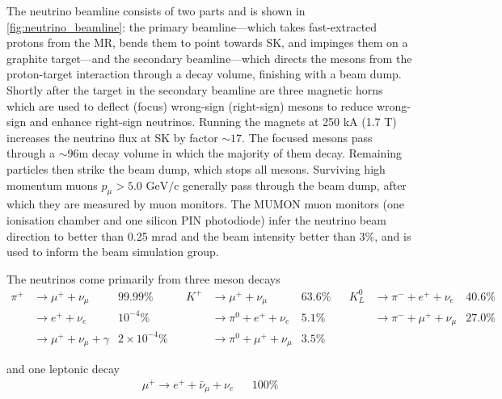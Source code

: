 The neutrino beamline consists of two parts and is shown in \autoref{fig:neutrino_beamline}: the primary beamline---which takes fast-extracted protons from the MR, bends them to point towards SK, and impinges them on a graphite target---and the secondary beamline---which directs the mesons from the proton-target interaction through a decay volume, finishing with a beam dump. Shortly after the target in the secondary beamline are three magnetic horns\cite{t2k_horns} which are used to deflect (focus) wrong-sign (right-sign) mesons to reduce wrong-sign and enhance right-sign neutrinos. Running the magnets at 250 kA (1.7 T) increases the neutrino flux at SK by factor $\sim17$\cite{t2k_beam}. The focused mesons pass through a $\sim96$m decay volume in which the majority of them decay. Remaining particles then strike the beam dump, which stops all mesons. Surviving high momentum muons $p_\mu > 5.0 \text{ GeV/c}$ generally pass through the beam dump, after which they are measured by muon monitors. The MUMON muon monitors (one ionisation chamber and one silicon PIN photodiode) infer the neutrino beam direction to better than 0.25 mrad and the beam intensity better than 3\%\cite{t2k_mumon,t2k_mumon2}, and is used to inform the beam simulation group.

The neutrinos come primarily from three meson decays
\begin{align*}
	\pi^+ & \rightarrow \mu^+ + \nu_\mu 		&  99.99\% 			& & K^+ & \rightarrow \mu^+ + \nu_\mu 			& 63.6\% & & K^0_L & \rightarrow \pi^- + e^+ + \nu_e 	  & 40.6\% \\
	      & \rightarrow e^+ + \nu_e 			&  10^{-4}\%		& &		& \rightarrow \pi^0 + e^+ + \nu_e 		& 5.1\%  & &	   & \rightarrow \pi^- + \mu^+ + \nu_\mu &  27.0\% \\
	      & \rightarrow \mu^+ + \nu_\mu + \gamma & 2\times 10^{-4}\%  & &		& \rightarrow \pi^0 + \mu^+ + \nu_\mu  	& 3.5\%  & &	   & & 		 &
\end{align*}

and one leptonic decay\cite{pdg_2017}
\begin{align*}
\mu^+ \rightarrow e^+ + \bar{\nu}_\mu + \nu_e & & 100\%
\end{align*}

